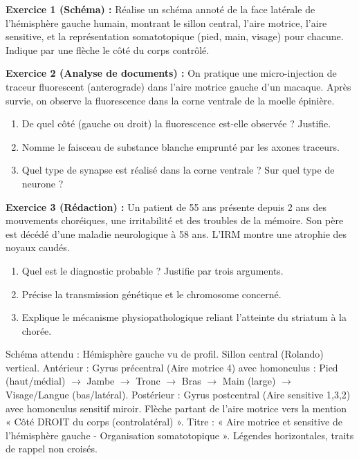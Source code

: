 \documentclass[11pt]{article}
\begin{document}
\begin{exercice}
\textbf{Exercice 1 (Schéma) :} Réalise un schéma annoté de la face latérale de l'hémisphère gauche humain, montrant le sillon central, l'aire motrice, l'aire sensitive, et la représentation somatotopique (pied, main, visage) pour chacune. Indique par une flèche le côté du corps contrôlé.

\textbf{Exercice 2 (Analyse de documents) :} On pratique une micro-injection de traceur fluorescent (anterograde) dans l'aire motrice gauche d'un macaque. Après survie, on observe la fluorescence dans la corne ventrale de la moelle épinière.
\begin{enumerate}
\item De quel côté (gauche ou droit) la fluorescence est-elle observée ? Justifie.
\item Nomme le faisceau de substance blanche emprunté par les axones traceurs.
\item Quel type de synapse est réalisé dans la corne ventrale ? Sur quel type de neurone ?
\end{enumerate}

\textbf{Exercice 3 (Rédaction) :} Un patient de 55 ans présente depuis 2 ans des mouvements choréiques, une irritabilité et des troubles de la mémoire. Son père est décédé d'une maladie neurologique à 58 ans. L'IRM montre une atrophie des noyaux caudés.
\begin{enumerate}
\item Quel est le diagnostic probable ? Justifie par trois arguments.
\item Précise la transmission génétique et le chromosome concerné.
\item Explique le mécanisme physiopathologique reliant l'atteinte du striatum à la chorée.
\end{enumerate}
\end{exercice}

\begin{corrige}[Exercice 1]
Schéma attendu : Hémisphère gauche vu de profil. Sillon central (Rolando) vertical. Antérieur : Gyrus précentral (Aire motrice 4) avec homonculus : Pied (haut/médial) $\rightarrow$ Jambe $\rightarrow$ Tronc $\rightarrow$ Bras $\rightarrow$ Main (large) $\rightarrow$ Visage/Langue (bas/latéral). Postérieur : Gyrus postcentral (Aire sensitive 1,3,2) avec homonculus sensitif miroir. Flèche partant de l'aire motrice vers la mention « Côté DROIT du corps (controlatéral) ». Titre : « Aire motrice et sensitive de l'hémisphère gauche - Organisation somatotopique ». Légendes horizontales, traits de rappel non croisés.
\end{corrige}
\end{document}
